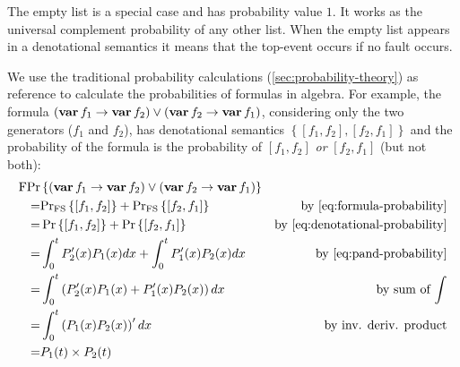 The empty list is a special case and has probability value $1$.
It works as the universal complement probability of any other list.
When the empty list appears in a denotational semantics it means that the top-event occurs if no fault occurs.

We use the traditional probability calculations (\cref{sec:probability-theory}) as reference to calculate the probabilities of formulas in \ac{algebra}.
%
For example, the formula $\left(\operatorname{\mathbf{var}} f_1 \rightarrow \operatorname{\mathbf{var}} f_2\right) \lor \left(\operatorname{\mathbf{var}} f_2 \rightarrow \operatorname{\mathbf{var}} f_1\right)$, considering only the two generators ($f_1$ and $f_2$), has denotational semantics $\left\{\left[f_1, f_2\right], \left[f_2, f_1\right]\right\}$ and the probability of the formula is the probability of $\left[f_1, f_2\right]$ \emph{or} $\left[f_2, f_1\right]$ (but not both):
%
\begin{align}
\formulaprobop&\left\{\left(\xbefore{\var{f_1}}{\var{f_2}}\right) \lor \left(\xbefore{\var{f_2}}{\var{f_1}}\right)\right\}\nonumber\\
=&\denotationalprob{\left[f_1,f_2\right]} + \denotationalprob{\left[f_2,f_1\right]} & \text{by \cref{eq:formula-probability}} \nonumber\\
= &\probability{\left[f_1,f_2\right]} + \probability{\left[f_2,f_1\right]} & \text{by \cref{eq:denotational-probability}}\nonumber\\
=&\int_0^t P'_2(x) P_1(x) dx + \int_0^t P'_1(x) P_2(x) dx & \text{by \cref{eq:pand-probability}} \nonumber\\
= & \int_0^t \left(P'_2(x) P_1(x) + P'_1(x) P_2(x)\right) dx & \text{by sum of $\int$} \nonumber\\
= & \int_0^t \left(P_1(x) P_2(x)\right)' dx & \text{by inv. deriv. product} \nonumber\\
= & P_1(t) \times P_2(t)\label{eq:prob-xbefore-sup-equiv-inf}
\end{align}

